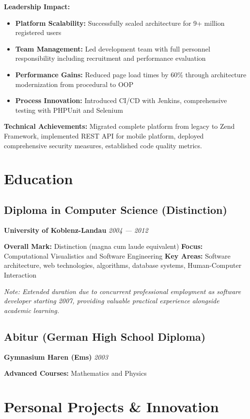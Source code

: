 \documentclass[10pt,a4paper]{article}
\newcommand{\achievement}[1]{\item \textbf{#1}}
\begin{document}
\textbf{Leadership Impact:}
\begin{itemize}
\achievement{Platform Scalability:} Successfully scaled architecture for 9+ million registered users
\achievement{Team Management:} Led development team with full personnel responsibility including recruitment and performance evaluation
\achievement{Performance Gains:} Reduced page load times by 60\% through architecture modernization from procedural to OOP
\achievement{Process Innovation:} Introduced CI/CD with Jenkins, comprehensive testing with PHPUnit and Selenium
\end{itemize}

\textbf{Technical Achievements:} Migrated complete platform from legacy to Zend Framework, implemented REST API for mobile platform, deployed comprehensive security measures, established code quality metrics.

\newpage

\section{Education}

\subsection{Diploma in Computer Science (Distinction)}
\textbf{University of Koblenz-Landau} \hfill \textit{2004 — 2012}

\textbf{Overall Mark:} Distinction (magna cum laude equivalent)  
\textbf{Focus:} Computational Visualistics and Software Engineering  
\textbf{Key Areas:} Software architecture, web technologies, algorithms, database systems, Human-Computer Interaction

\textit{Note: Extended duration due to concurrent professional employment as software developer starting 2007, providing valuable practical experience alongside academic learning.}

\subsection{Abitur (German High School Diploma)}
\textbf{Gymnasium Haren (Ems)} \hfill \textit{2003}

\textbf{Advanced Courses:} Mathematics and Physics

\section{Personal Projects \& Innovation}
\end{document}

